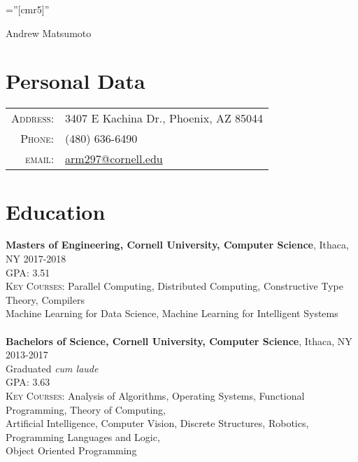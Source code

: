 \documentclass[article,8pt]{article}
\begin{document}

\pagestyle{empty} %

\font\fb=''[cmr5]'' %

\par{\centering
		{\Huge Andrew Matsumoto}
	\bigskip\par}

\section{Personal Data}

\begin{tabular}{rl}
    \textsc{Address:}   & 3407 E Kachina Dr., Phoenix, AZ 85044\\
    \textsc{Phone:}     & (480) 636-6490\\
    \textsc{email:}     & \href{mailto:arm297@cornell.edu}{arm297@cornell.edu}
\end{tabular}

\section{Education}
\textbf{Masters of Engineering, Cornell University, Computer Science}, Ithaca, NY 2017-2018\\
\hspace*{1em}\textsc{GPA}: 3.51\\
\hspace*{1em}\textsc{Key Courses}: Parallel Computing, Distributed Computing, Constructive Type Theory, Compilers\\
\hspace*{1em}Machine Learning for Data Science, Machine Learning for Intelligent Systems
\\\\
\textbf{Bachelors of Science, Cornell University, Computer Science}, Ithaca, NY 2013-2017\\
\hspace*{1em}Graduated \textit{cum laude}\\
\hspace*{1em}\textsc{GPA}: 3.63\\
\hspace*{1em}\textsc{Key Courses}: Analysis of Algorithms, Operating Systems, Functional Programming, Theory of Computing,\\
\hspace*{1em}Artificial Intelligence, Computer Vision, Discrete Structures, Robotics, Programming Languages and Logic,\\
\hspace*{1em}Object Oriented Programming
\end{document}
